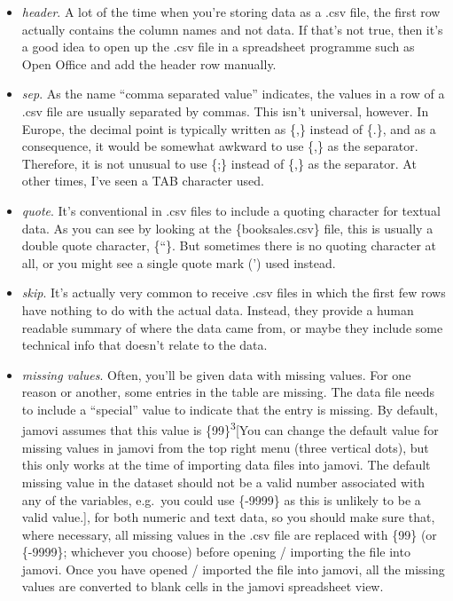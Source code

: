 \documentclass[
]{book}
\begin{document}
\begin{itemize}
\item
  \emph{header}. A lot of the time when you're storing data as a .csv file, the first row actually contains the column names and not data. If that's not true, then it's a good idea to open up the .csv file in a spreadsheet programme such as Open Office and add the header row manually.
\item
  \emph{sep}. As the name ``comma separated value'' indicates, the values in a row of a .csv file are usually separated by commas. This isn't universal, however. In Europe, the decimal point is typically written as \{,\} instead of \{.\}, and as a consequence, it would be somewhat awkward to use \{,\} as the separator. Therefore, it is not unusual to use \{;\} instead of \{,\} as the separator. At other times, I've seen a TAB character used.
\item
  \emph{quote}. It's conventional in .csv files to include a quoting character for textual data. As you can see by looking at the \{booksales.csv\} file, this is usually a double quote character, \{``\}. But sometimes there is no quoting character at all, or you might see a single quote mark (') used instead.
\item
  \emph{skip}. It's actually very common to receive .csv files in which the first few rows have nothing to do with the actual data. Instead, they provide a human readable summary of where the data came from, or maybe they include some technical info that doesn't relate to the data.
\item
  \emph{missing values}. Often, you'll be given data with missing values. For one reason or another, some entries in the table are missing. The data file needs to include a ``special'' value to indicate that the entry is missing. By default, jamovi assumes that this value is \{99\}\textsuperscript{3}{[}You can change the default value for missing values in jamovi from the top right menu (three vertical dots), but this only works at the time of importing data files into jamovi. The default missing value in the dataset should not be a valid number associated with any of the variables, e.g.~you could use \{-9999\} as this is unlikely to be a valid value.{]}, for both numeric and text data, so you should make sure that, where necessary, all missing values in the .csv file are replaced with \{99\} (or \{-9999\}; whichever you choose) before opening / importing the file into jamovi. Once you have opened / imported the file into jamovi, all the missing values are converted to blank cells in the jamovi spreadsheet view.
\end{itemize}
\end{document}
